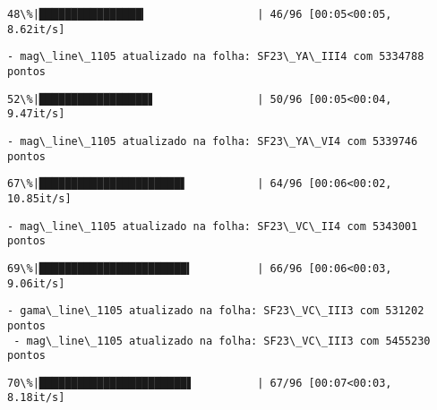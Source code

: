 \documentclass[11pt]{article}
\begin{document}
    \begin{Verbatim}[commandchars=\\\{\}]
 48\%|████████████████▎                 | 46/96 [00:05<00:05,  8.62it/s]
    \end{Verbatim}

    \begin{Verbatim}[commandchars=\\\{\}]
 - mag\_line\_1105 atualizado na folha: SF23\_YA\_III4 com 5334788 pontos
    \end{Verbatim}

    \begin{Verbatim}[commandchars=\\\{\}]
 52\%|█████████████████▋                | 50/96 [00:05<00:04,  9.47it/s]
    \end{Verbatim}

    \begin{Verbatim}[commandchars=\\\{\}]
 - mag\_line\_1105 atualizado na folha: SF23\_YA\_VI4 com 5339746 pontos
    \end{Verbatim}

    \begin{Verbatim}[commandchars=\\\{\}]
 67\%|██████████████████████▋           | 64/96 [00:06<00:02, 10.85it/s]
    \end{Verbatim}

    \begin{Verbatim}[commandchars=\\\{\}]
 - mag\_line\_1105 atualizado na folha: SF23\_VC\_II4 com 5343001 pontos
    \end{Verbatim}

    \begin{Verbatim}[commandchars=\\\{\}]
 69\%|███████████████████████▍          | 66/96 [00:06<00:03,  9.06it/s]
    \end{Verbatim}

    \begin{Verbatim}[commandchars=\\\{\}]
 - gama\_line\_1105 atualizado na folha: SF23\_VC\_III3 com 531202 pontos
 - mag\_line\_1105 atualizado na folha: SF23\_VC\_III3 com 5455230 pontos
    \end{Verbatim}

    \begin{Verbatim}[commandchars=\\\{\}]
 70\%|███████████████████████▋          | 67/96 [00:07<00:03,  8.18it/s]
    \end{Verbatim}
\end{document}
